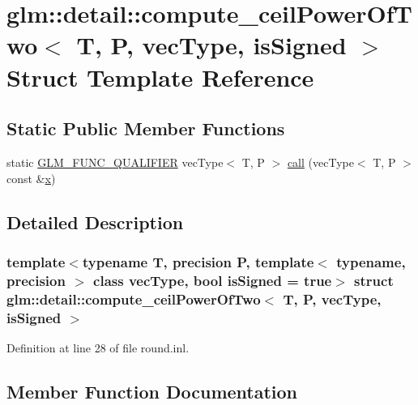 \hypertarget{structglm_1_1detail_1_1compute__ceil_power_of_two}{}\section{glm\+::detail\+::compute\+\_\+ceil\+Power\+Of\+Two$<$ T, P, vec\+Type, is\+Signed $>$ Struct Template Reference}
\label{structglm_1_1detail_1_1compute__ceil_power_of_two}
\subsection*{Static Public Member Functions}
\begin{DoxyCompactItemize}
\item 
static \mbox{\hyperlink{setup_8hpp_a33fdea6f91c5f834105f7415e2a64407}{G\+L\+M\+\_\+\+F\+U\+N\+C\+\_\+\+Q\+U\+A\+L\+I\+F\+I\+ER}} vec\+Type$<$ T, P $>$ \mbox{\hyperlink{structglm_1_1detail_1_1compute__ceil_power_of_two_a81872e12467950a992a4d10c6d73bc45}{call}} (vec\+Type$<$ T, P $>$ const \&\mbox{\hyperlink{glad_8h_a92d0386e5c19fb81ea88c9f99644ab1d}{x}})
\end{DoxyCompactItemize}


\subsection{Detailed Description}
\subsubsection*{template$<$typename T, precision P, template$<$ typename, precision $>$ class vec\+Type, bool is\+Signed = true$>$\newline
struct glm\+::detail\+::compute\+\_\+ceil\+Power\+Of\+Two$<$ T, P, vec\+Type, is\+Signed $>$}



Definition at line 28 of file round.\+inl.



\subsection{Member Function Documentation}
\mbox{\label{structglm_1_1detail_1_1compute__ceil_power_of_two_a81872e12467950a992a4d10c6d73bc45}} 
